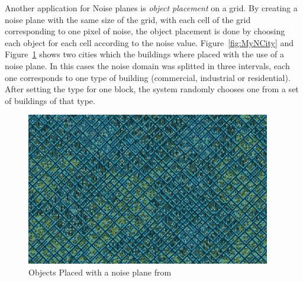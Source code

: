 Another application for Noise planes is \emph{object placement} on a grid. By creating a noise plane with the same size of the grid, with each cell of the grid corresponding to one pixel of noise, the object placement is done by choosing each object for each cell according to the noise value. Figure~\ref{fig:MyNCity} and
Figure~\ref{fig:NCity} shows two cities which the buildings where placed with the use of a noise plane. In this cases the noise domain was splitted in three intervals, each one corresponds to one type of building (commercial, industrial or residential). After setting the type for one block, the system randomly chooses one from a set of buildings of that type.


\begin{figure}[htbp]
	\centering
	\includegraphics[width=0.95\textwidth]{img/Theory/Perlin_Noise/NoisyCity.jpg}
	\caption{Objects Placed with a noise plane from \cite{NoisesGAMES}}
	\label{fig:NCity}
\end{figure}

